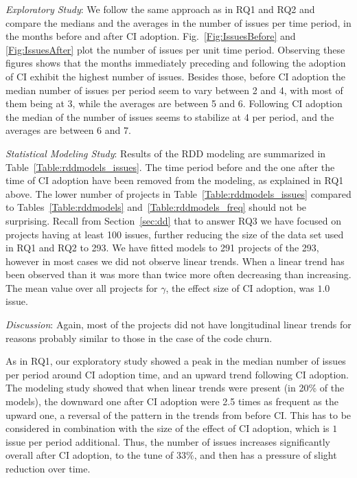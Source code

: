 \smallskip\noindent \emph{Exploratory Study}:
We follow the same approach as in RQ1 and RQ2 and compare the 
medians and the averages in the number of issues per time period, in the 
months before and after CI adoption.
Fig.~\ref{Fig:IssuesBefore} and \ref{Fig:IssuesAfter} plot the number of 
issues per unit time period.
Observing these figures shows that the months immediately preceding 
and following the adoption of CI exhibit the highest number of issues.
Besides those, before CI adoption the median number of issues per period seem to vary between 2 and 4, with most of them being at 3, while the averages are between 5 and 6.
Following CI adoption the median of the number of issues seems to 
stabilize at 4 per period, and the averages are between 6 and 7.

%

\smallskip\noindent \emph{Statistical Modeling Study}:
Results of the RDD modeling are summarized in Table~\ref{Table:rddmodels_issues}.
The time period before and the one after the time of CI adoption have been removed from the modeling, as explained in RQ1 above.
The lower number of projects in Table~\ref{Table:rddmodels_issues} 
compared to Tables~\ref{Table:rddmodels} and~\ref{Table:rddmodels_freq} 
should not be surprising. 
Recall from Section~\ref{sec:dd} that to answer RQ3 we have focused on 
projects having at least 100 issues, further reducing the size of the data set 
used in RQ1 and RQ2 to 293.
We have fitted models to 291 projects of the 293, however in most cases we 
did not observe linear trends.
When a linear trend has been observed than it was more than twice more 
often decreasing than increasing.
The mean value over all projects for $\gamma$, the effect size of CI adoption, 
was $1.0$ issue.


\smallskip\noindent \emph{Discussion}:
Again, most of the projects did not have longitudinal linear trends for reasons probably similar to those in the case of the code churn.

As in RQ1, our exploratory study showed a peak in the median number of issues per period around CI adoption time, and an upward trend following CI adoption.
The modeling study showed that when linear trends were present (in 20\% 
of the models), the downward one after CI adoption were 2.5 times as frequent 
as the upward one, a reversal of the pattern in the trends from before CI.
This has to be considered in combination with the size of the effect of CI adoption, which is $1$ issue per period additional.
Thus, the number of issues increases significantly overall after CI adoption, to the tune of $33\%$, and then has a pressure of slight reduction over time.


